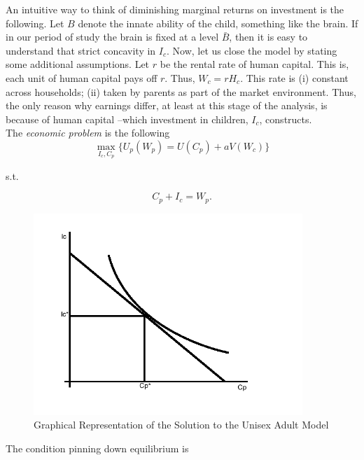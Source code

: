 \indent An intuitive way to think of diminishing marginal returns on investment is the following. Let $B$ denote the innate ability of the child, something like the brain. If in our period of study the brain is fixed at a level $\bar{B}$, then it is easy to understand that strict concavity in $I_{c}$. Now, let us close the model by stating some additional assumptions. Let $r$ be the rental rate of human capital. This is, each unit of human capital pays off $r$. Thus, $W_{c} = r H_{c}$. This rate is (i) constant across households; (ii) taken by parents as part of the market environment. Thus, the only reason why earnings differ, at least at this stage of the analysis, is because of human capital --which investment in children, $I_{c}$, constructs.\\

\indent The \textit{economic problem} is the following
\begin{equation}
\max_{I_{c}, C_{p}} \{ U_{p} (W_{p}) = U(C_{p}) + a V(W_{c}) \}
\end{equation}  

\noindent s.t.

\begin{equation}
C_{p} + I_{c} = W_{p}. \label{eq:constraint}
\end{equation}

\begin{center}
\begin{figure}[H] 
\caption{Graphical Representation of the Solution to the Unisex Adult Model}
\centering
\includegraphics[width=4in, height=3in]{Plots/EconProb.png}
\end{figure}
\end{center}


\indent The condition pinning down equilibrium is 

